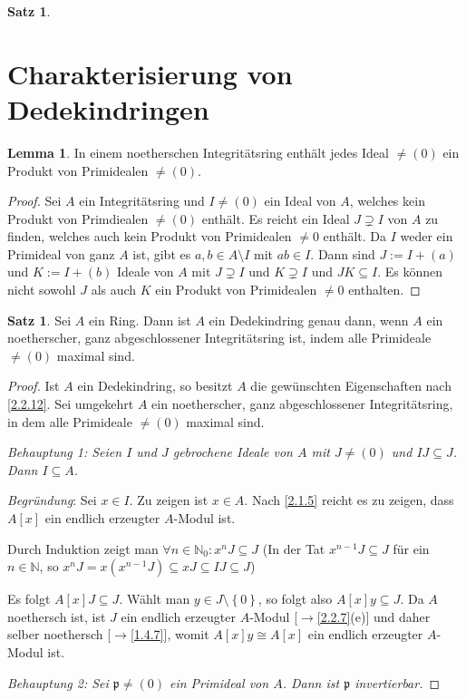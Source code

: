 \documentclass[
twoside=semi,
fontsize=12,
DIV=12, 
cleardoublepage=current,
leqno,
headings=optiontoheadandtoc, 
toc=idx
]{scrbook}
\newcommand{\N}{\mathbb{N}}
\newcommand{\set}[1]{\left\{ #1 \right\}}
\theoremstyle{definition}
\newtheorem{satz}[definition]{Satz}
\newtheorem{lemma}[definition]{Lemma}
\begin{document}
\begin{satz}
   		\section{Charakterisierung von Dedekindringen}
   		\begin{lemma}\label{2.3.1}
   			In einem noetherschen Integrit\"atsring enth\"alt jedes Ideal $\neq (0)$ ein Produkt von Primidealen $\neq (0)$.
   			
   			\begin{proof}
   				Sei $A$ ein Integrit\"atsring und $I \neq (0)$ ein Ideal von $A$, welches kein Produkt von Primdiealen $\neq (0)$ enth\"alt. Es reicht ein Ideal $J \supsetneq I$ von $A$ zu finden, welches auch kein Produkt von Primidealen $\neq 0$ enth\"alt. Da $I$ weder ein Primideal von ganz $A$ ist, gibt es $a,b \in A\setminus I$ mit $ab \in I$. Dann sind $J := I + (a)$ und $K:= I+(b)$ Ideale von $A$ mit $J \supsetneq I$ und $K \supsetneq I$ und $JK \subseteq I$. Es k\"onnen nicht sowohl $J$ als auch $K$ ein Produkt von Primidealen $\neq 0$ enthalten.
   			\end{proof} 
   		\end{lemma}
   	
   		\begin{satz}\label{2.3.2}
   			Sei $A$ ein Ring. Dann ist $A$ ein Dedekindring genau dann, wenn $A$ ein noetherscher, ganz abgeschlossener Integrit\"atsring ist, indem alle Primideale $\neq (0)$ maximal sind.
   			
   			\begin{proof}
   				Ist $A$ ein Dedekindring, so besitzt $A$ die gew\"unschten Eigenschaften nach \ref{2.2.12}. Sei umgekehrt $A$ ein noetherscher, ganz abgeschlossener Integrit\"atsring, in dem alle Primideale $\neq (0)$ maximal sind.
   				
   				\emph{Behauptung 1: Seien $I$ und $J$ gebrochene Ideale von $A$ mit $J \neq (0)$ und $IJ \subseteq J$. Dann $I \subseteq A$.}
   				
   				\emph{Begr\"undung}: Sei $x \in I$. Zu zeigen ist $x \in A$. Nach \ref{2.1.5} reicht es zu zeigen, dass $A[x]$ ein endlich erzeugter $A$-Modul ist. 
   				
   				Durch Induktion zeigt man $\forall n \in \N_0: x^nJ \subseteq J$  (In der Tat $x^{n-1}J \subseteq J$ f\"ur ein $n\in \N$, so $x^nJ = x(x^{n-1}J) \subseteq xJ \subseteq IJ \subseteq J$)
   				
   				Es folgt $A[x]J \subseteq J$. W\"ahlt man $y \in J \setminus \set{0}$, so folgt also $A[x]y \subseteq J$. Da $A$ noethersch ist, ist $J$ ein endlich erzeugter $A$-Modul [$\to$\ref{2.2.7}(e)] und daher selber noethersch [$\to$\ref{1.4.7}], womit $A[x]y \cong A[x]$ ein endlich erzeugter $A$-Modul ist.
   				
   				\vspace*{2mm}
   				\emph{Behauptung 2: Sei $\mathfrak{p} \neq (0)$ ein Primideal von $A$. Dann ist $\mathfrak{p}$ invertierbar.}
   			\end{proof}
   		\end{satz}
   		
 	\end{satz}
\backmatter
\printindex
\end{document}
